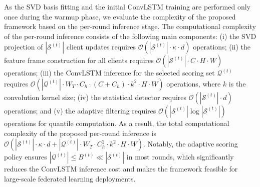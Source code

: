 As the SVD basis fitting and the initial ConvLSTM training are performed only once during the warmup phase, we evaluate the complexity of the proposed framework based on the per-round inference stage. The computational complexity of the per-round inference consists of the following main components: (i) the SVD projection of $|\mathcal{S}^{(t)}|$ client updates requires $\mathcal{O}(|\mathcal{S}^{(t)}| \cdot \kappa \cdot d)$ operations; (ii) the feature frame construction for all clients requires $\mathcal{O}(|\mathcal{S}^{(t)}| \cdot C \cdot H \cdot W)$ operations; (iii) the ConvLSTM inference for the selected scoring set $\mathcal{Q}^{(t)}$ requires $\mathcal{O}(|\mathcal{Q}^{(t)}| \cdot W_T \cdot C_h \cdot (C + C_h) \cdot k^2 \cdot H \cdot W)$ operations, where $k$ is the convolution kernel size; (iv) the statistical detector requires $\mathcal{O}(|\mathcal{S}^{(t)}| \cdot d)$ operations; and (v) the adaptive filtering requires $\mathcal{O}(|\mathcal{S}^{(t)}| \log |\mathcal{S}^{(t)}|)$ operations for quantile computation. As a result, the total computational complexity of the proposed per-round inference is $\mathcal{O}(|\mathcal{S}^{(t)}| \cdot \kappa \cdot d + |\mathcal{Q}^{(t)}| \cdot W_T \cdot C_h^2 \cdot k^2 \cdot H \cdot W)$. Notably, the adaptive scoring policy ensures $|\mathcal{Q}^{(t)}| \leq B^{(t)} \ll |\mathcal{S}^{(t)}|$ in most rounds, which significantly reduces the ConvLSTM inference cost and makes the framework feasible for large-scale federated learning deployments.
